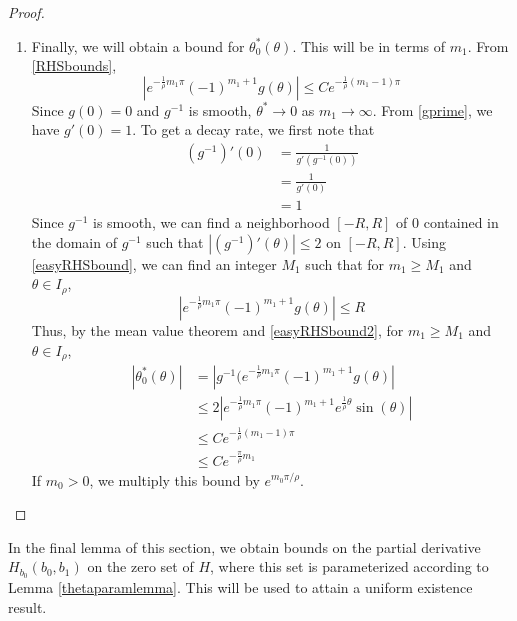 \documentclass[thesis.tex]{subfiles}
\begin{document}
\begin{lemma}
\begin{proof}
\begin{enumerate}
\item Finally, we will obtain a bound for $\theta_0^*(\theta)$. This will be in terms of $m_1$. From \eqref{RHSbounds},
	\begin{equation}\label{easyRHSbound}
	|e^{ -\frac{1}{\rho} m_1 \pi } (-1)^{m_1 + 1} g(\theta)| \leq C e^{ -\frac{1}{\rho}(m_1 - 1) \pi }
	\end{equation}
	Since $g(0) = 0$ and $g^{-1}$ is smooth, $\theta^* \rightarrow 0$ as $m_1 \rightarrow \infty$. From \eqref{gprime}, we have $g'(0) = 1$. To get a decay rate, we first note that
	\begin{align*}
	(g^{-1})'(0) &= \frac{1}{g'(g^{-1}(0))} \\
	&= \frac{1}{g'(0)} \\
	&= 1
	\end{align*}
	Since $g^{-1}$ is smooth, we can find a neighborhood $[-R, R]$ of 0 contained in the domain of $g^{-1}$ such that $|(g^{-1})'(\theta)| \leq 2$ on $[-R, R]$. Using \eqref{easyRHSbound}, we can find an integer $M_1$ such that for $m_1 \geq M_1$ and $\theta \in I_\rho$,
	\begin{equation}\label{easyRHSbound2}
	|e^{ -\frac{1}{\rho} m_1 \pi } (-1)^{m_1 + 1} g(\theta)| \leq R
	\end{equation}
	Thus, by the mean value theorem and \eqref{easyRHSbound2}, for $m_1 \geq M_1$ and $\theta \in I_\rho$,
	\begin{align*}
	|\theta_0^*(\theta)| &= | g^{-1}(e^{ -\frac{1}{\rho} m_1 \pi } (-1)^{m_1 + 1} g(\theta) | \\
	&\leq 2 |e^{ -\frac{1}{\rho} m_1 \pi } (-1)^{m_1 + 1}  e^{ \frac{1}{\rho} \theta } \sin(\theta)| \\
	&\leq C e^{ -\frac{1}{\rho}(m_1 - 1) \pi } \\
	&\leq C e^{ -\frac{\pi}{\rho} m_1 }
	\end{align*}
	If $m_0 > 0$, we multiply this bound by $e^{m_0 \pi/\rho}$.
\end{enumerate}
\end{proof}
\end{lemma}

In the final lemma of this section, we obtain bounds on the partial derivative $H_{b_0} (b_0, b_1)$ on the zero set of $H$, where this set is parameterized according to Lemma \ref{thetaparamlemma}. This will be used to attain a uniform existence result.

\end{document}

